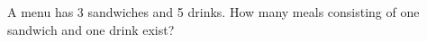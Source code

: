 A menu has 3 sandwiches and 5 drinks. How many meals consisting of one sandwich and one drink exist?
